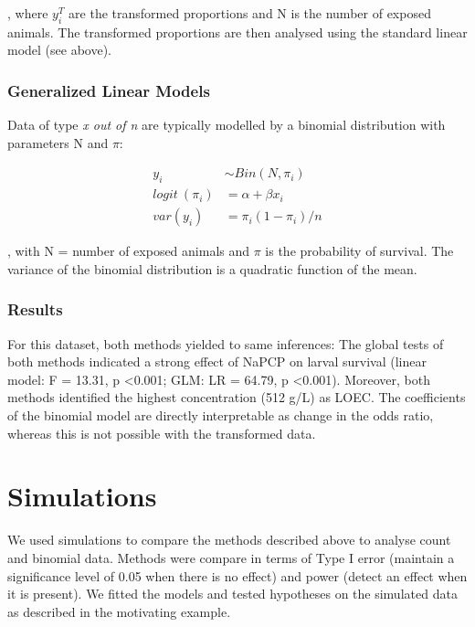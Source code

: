 \documentclass{scrartcl}
\begin{document}
, where $y_i^T$ are the transformed proportions and N is the number of exposed animals.
The transformed proportions are then analysed using the standard linear model (see above).

\subsubsection{Generalized Linear Models}

Data of type \emph{x out of n} are typically modelled by a binomial distribution with parameters N and $\pi$:

\begin{align}
  y_i &\sim Bin(N, \pi_i) \nonumber \\
  logit~(\pi_i) &= \alpha + \beta x_i \label{eqn:bin} \\
  var(y_i) &=  \pi_i (1 - \pi_i) / n \nonumber
\end{align}

, with N = number of exposed animals and $\pi$ is the probability of survival.
The variance of the binomial distribution is a quadratic function of the mean.


\subsubsection{Results}
For this dataset, both methods yielded to same inferences:
The global tests of both methods indicated a strong effect of NaPCP on larval survival (linear model: F = 13.31, p \textless 0.001; GLM: LR = 64.79, p \textless 0.001).
Moreover, both methods identified the highest concentration (512 \textmu g/L) as LOEC. 
The coefficients of the binomial model are directly interpretable as change in the odds ratio, whereas this is not possible with the transformed data.







\section{Simulations}
We used simulations to compare the methods described above to analyse count and binomial data.
Methods were compare in terms of Type I error (maintain a significance level of 0.05 when there is no effect) and power (detect an effect when it is present). 
We fitted the models and tested hypotheses on the simulated data as described in the motivating example.
\end{document}
